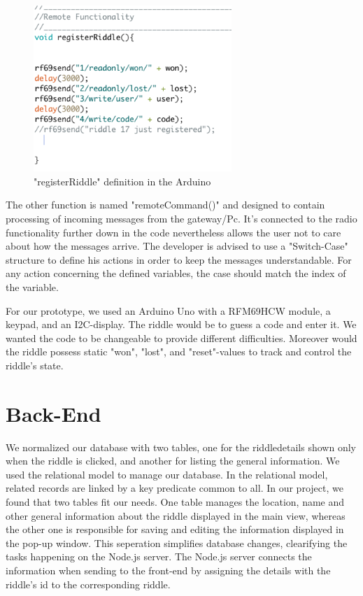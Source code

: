 \begin{figure}[th]
	\centering
	\includegraphics[width=75mm,scale=0.75]{Figures/registerRiddle}
	\decoRule
	\caption[FrontViewTable]{"registerRiddle" definition in the Arduino}
	\label{fig:FrontViewTable}
\end{figure}


The other function is named "remoteCommand()" and designed to contain processing of incoming messages from the gateway/Pc.
It's connected to the radio functionality further down in the code nevertheless allows the user not to care about how the messages arrive.
The developer is advised to use a "Switch-Case" structure to define his actions in order to keep the messages understandable. 
For any action concerning the defined variables, the case should match the index of the variable.

For our prototype, we used an Arduino Uno with a RFM69HCW module, a keypad, and an I2C-display. 
The riddle would be to guess a code and enter it. 
We wanted the code to be changeable to provide different difficulties. 
Moreover would the riddle possess static  "won", "lost", and "reset"-values to track and control the riddle's state.

\section{Back-End}
We normalized our database with two tables, one for the riddledetails shown only when the riddle is clicked, and another for listing the general information.
We used the relational model to manage our database. 
In the relational model, related records are linked by a key predicate common to all. 
In our project, we found that two tables fit our needs. 
One table manages the location, name and other general information about the riddle displayed in the main view, 
whereas the other one is responsible for saving and editing the information displayed in the pop-up window. 
This seperation simplifies database changes, clearifying the tasks happening on the Node.js server.
The Node.js server connects the information when sending to the front-end by assigning the details with the riddle's id to the corresponding riddle. 

